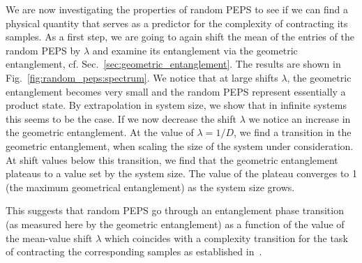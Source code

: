 \documentclass[aps,notitlepage,twocolumn,nofootinbib,superscriptaddress,pra,10pt]{revtex4-2}
\begin{document}
We are now investigating the properties of random PEPS to see if we can find a physical quantity that serves as a predictor for the complexity of contracting its samples.
As a first step, we are going to again shift the mean of the entries of the random PEPS by $\lambda$ and examine its entanglement via the geometric entanglement, cf. Sec.~\ref{sec:geometric_entanglement}. The results are shown in Fig.~\ref{fig:random_peps:spectrum}. 
We notice that at large shifts $\lambda$, the geometric entanglement becomes very small and the random PEPS represent essentially a product state. 
By extrapolation in system size, we show that in infinite systems this seems to be the case.
If we now decrease the shift $\lambda$ we notice an increase in the geometric entanglement. At the value of $\lambda = 1/D$, we find a transition in the geometric entanglement, when scaling the size of the system under consideration. At shift values below this transition, we find that the geometric entanglement plateaus to a value set by the system size. The value of the plateau converges to 1 (the maximum geometrical entanglement) as the system size grows.

This suggests that random PEPS go through an entanglement phase transition (as measured here by the geometric entanglement) as a function of the value of the mean-value shift $\lambda$ which coincides with a complexity transition for the task of contracting the corresponding samples as established in~\cite{chen2024signproblem}.\\
\end{document}
